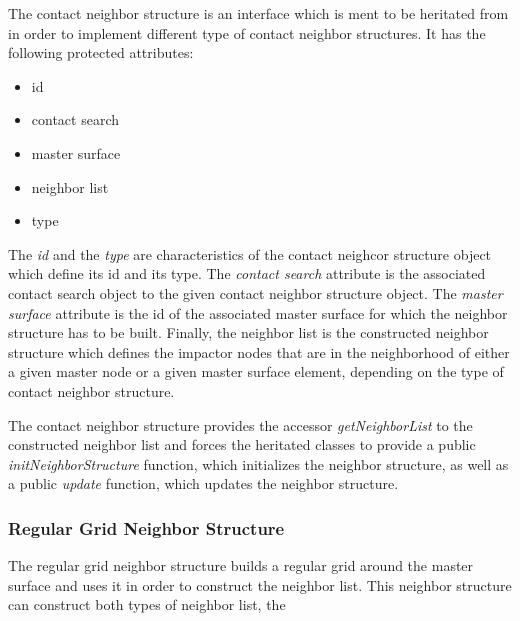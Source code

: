 \documentclass[a4paper,11pt]{book}
\begin{document}
The contact neighbor structure is an interface which is ment to be heritated from in order to implement different type of contact neighbor structures. It has the following protected attributes:
\begin{itemize}
  \item id
  \item contact search
  \item master surface
  \item neighbor list
  \item type
\end{itemize}
The \emph{id} and the \emph{type} are characteristics of the contact neighcor structure object which define its id and its type. The \emph{contact search} attribute is the associated contact search object to the given contact neighbor structure object. The \emph{master surface} attribute is the id of the associated master surface for which the neighbor structure has to be built. Finally, the neighbor list is the constructed neighbor structure which defines the impactor nodes that are in the neighborhood of either a given master node or a given master surface element, depending on the type of contact neighbor structure.

The contact neighbor structure provides the accessor \emph{getNeighborList} to the constructed neighbor list and forces the heritated classes to provide a public \emph{initNeighborStructure} function, which initializes the neighbor structure, as well as a public \emph{update} function, which updates the neighbor structure.

\subsubsection{Regular Grid Neighbor Structure}

The regular grid neighbor structure builds a regular grid around the master surface and uses it in order to construct the neighbor list. This neighbor structure can construct both types of neighbor list, the 
\end{document}
